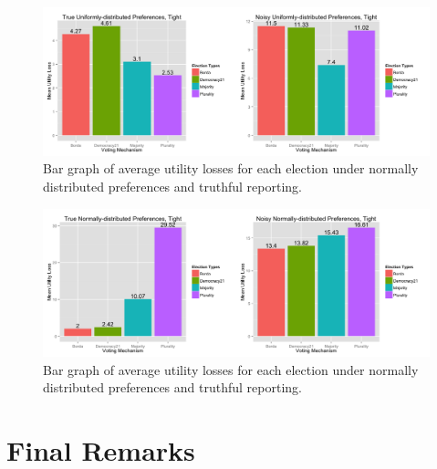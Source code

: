 \documentclass[11pt]{scrartcl}
\begin{document}
\begin{figure}[H]\center
\includegraphics[scale=0.38]{uniform_tight.png}
\caption{Bar graph of average utility losses for each election under normally distributed preferences and truthful reporting.}
\end{figure}

\begin{figure}[H]\center
\includegraphics[scale=0.38]{normal_tight.png}
\caption{Bar graph of average utility losses for each election under normally distributed preferences and truthful reporting.}
\end{figure}


\section{Final Remarks}
\end{document}
